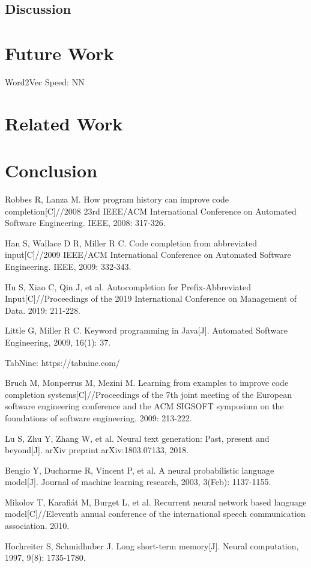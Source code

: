 \documentclass[PRO,english]{ipsj}
\begin{document}
\subsection{Discussion}

\section{Future Work}
Word2Vec
Speed: NN

\section{Related Work}

\section{Conclusion}




\begin{thebibliography}{10}
 Robbes R, Lanza M. How program history can improve code completion[C]//2008 23rd IEEE/ACM International Conference on Automated Software Engineering. IEEE, 2008: 317-326.

 Han S, Wallace D R, Miller R C. Code completion from abbreviated input[C]//2009 IEEE/ACM International Conference on Automated Software Engineering. IEEE, 2009: 332-343.

 Hu S, Xiao C, Qin J, et al. Autocompletion for Prefix-Abbreviated Input[C]//Proceedings of the 2019 International Conference on Management of Data. 2019: 211-228.

 Little G, Miller R C. Keyword programming in Java[J]. Automated Software Engineering, 2009, 16(1): 37.

 TabNine: https://tabnine.com/

 Bruch M, Monperrus M, Mezini M. Learning from examples to improve code completion systems[C]//Proceedings of the 7th joint meeting of the European software engineering conference and the ACM SIGSOFT symposium on the foundations of software engineering. 2009: 213-222.

 Lu S, Zhu Y, Zhang W, et al. Neural text generation: Past, present and beyond[J]. arXiv preprint arXiv:1803.07133, 2018.

 Bengio Y, Ducharme R, Vincent P, et al. A neural probabilistic language model[J]. Journal of machine learning research, 2003, 3(Feb): 1137-1155.

 Mikolov T, Karafiát M, Burget L, et al. Recurrent neural network based language model[C]//Eleventh annual conference of the international speech communication association. 2010.


 Hochreiter S, Schmidhuber J. Long short-term memory[J]. Neural computation, 1997, 9(8): 1735-1780.

\end{thebibliography}
\end{document}
